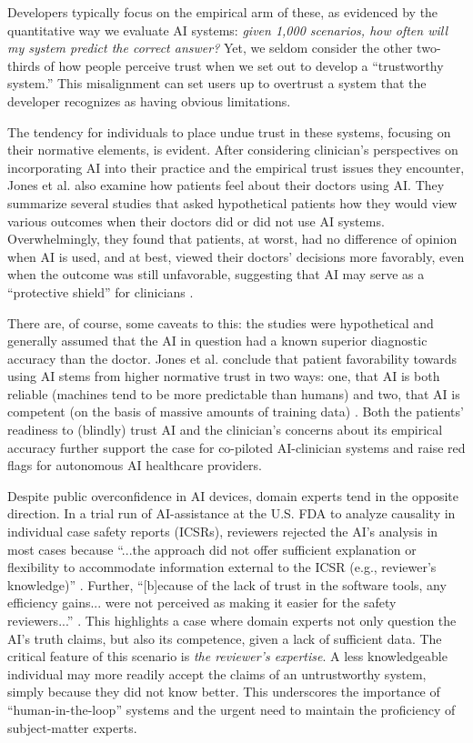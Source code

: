 \documentclass[authoryear,preprint,12pt]{elsarticle}
\begin{document}
Developers typically focus on the empirical arm of these, as evidenced by the
quantitative way we evaluate AI systems: \textit{given 1,000 scenarios, how
often will my system predict the correct answer?} Yet, we seldom consider the
other two-thirds of how people perceive trust when we set out to develop a
``trustworthy system.'' This misalignment can set users up to overtrust a system
that the developer recognizes as having obvious limitations. 

The tendency for individuals to place undue trust in these systems, focusing on
their normative elements, is evident. After considering clinician's perspectives
on incorporating AI into their practice and the empirical trust issues they
encounter, Jones et al. \cite{jonesArtificialIntelligenceClinical2023} also
examine how patients feel about their doctors using AI. They summarize several
studies that asked hypothetical patients how they would view various outcomes
when their doctors did or did not use AI systems. Overwhelmingly, they found
that patients, at worst, had no difference of opinion when AI is used, and at
best, viewed their doctors' decisions more favorably, even when the outcome was
still unfavorable, suggesting that AI may serve as a ``protective shield'' for
clinicians \cite{jonesArtificialIntelligenceClinical2023}. 

There are, of course, some caveats to this: the studies were hypothetical and
generally assumed that the AI in question had a known superior diagnostic
accuracy than the doctor. Jones et al. conclude that patient favorability
towards using AI stems from higher normative trust in two ways: one, that AI is
both reliable (machines tend to be more predictable than humans) and two, that
AI is competent (on the basis of massive amounts of training data)
\cite{jonesArtificialIntelligenceClinical2023}. Both the patients' readiness to
(blindly) trust AI and the clinician's concerns about its empirical accuracy
further support the case for co-piloted AI-clinician systems and raise red flags
for autonomous AI healthcare providers. 

Despite public overconfidence in AI devices, domain experts tend in the opposite
direction. In a trial run of AI-assistance at the U.S. FDA to analyze causality
in individual case safety reports (ICSRs), reviewers rejected the AI's analysis
in most cases because ``...the approach did not offer sufficient explanation or
flexibility to accommodate information external to the ICSR (e.g., reviewer's
knowledge)'' \cite{ballTrustVerifyLessons2024}. Further, ``[b]ecause of the lack
of trust in the software tools, any efficiency gains... were not perceived as
making it easier for the safety reviewers...''
\cite{ballTrustVerifyLessons2024}. This highlights a case where domain experts
not only question the AI's truth claims, but also its competence, given a lack
of sufficient data. The critical feature of this scenario is \textit{the
reviewer's expertise}. A less knowledgeable individual may more readily accept
the claims of an untrustworthy system, simply because they did not know better.
This underscores the importance of ``human-in-the-loop'' systems and the urgent
need to maintain the proficiency of subject-matter experts. 
\end{document}
